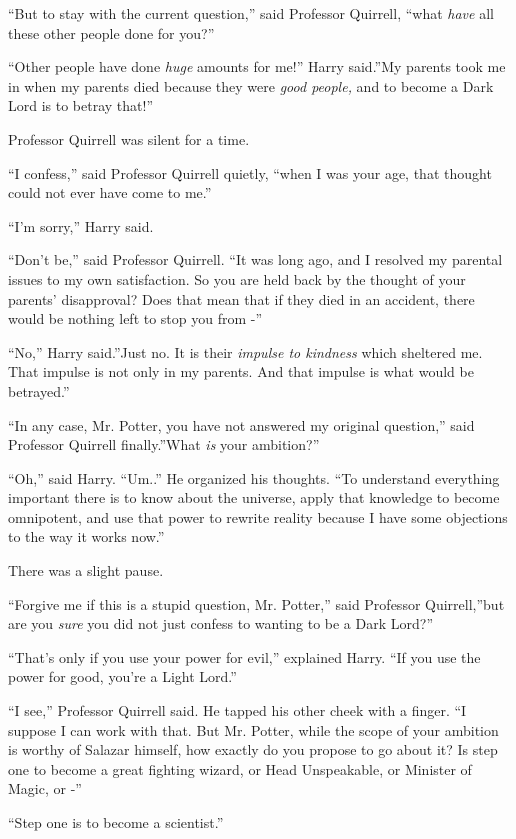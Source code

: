``But to stay with the current question,'' said Professor Quirrell,
``what \emph{have} all these other people done for you?''

``Other people have done \emph{huge} amounts for me!'' Harry said.''My
parents took me in when my parents died because they were \emph{good
people,} and to become a Dark Lord is to betray that!''

Professor Quirrell was silent for a time.

``I confess,'' said Professor Quirrell quietly, ``when I was your age,
that thought could not ever have come to me.''

``I'm sorry,'' Harry said.

``Don't be,'' said Professor Quirrell. ``It was long ago, and I resolved
my parental issues to my own satisfaction. So you are held back by the
thought of your parents' disapproval? Does that mean that if they died
in an accident, there would be nothing left to stop you from -''

``No,'' Harry said.''Just no. It is their \emph{impulse to kindness}
which sheltered me. That impulse is not only in my parents. And that
impulse is what would be betrayed.''

``In any case, Mr. Potter, you have not answered my original question,''
said Professor Quirrell finally.''What \emph{is} your ambition?''

``Oh,'' said Harry. ``Um..'' He organized his thoughts. ``To understand
everything important there is to know about the universe, apply that
knowledge to become omnipotent, and use that power to rewrite reality
because I have some objections to the way it works now.''

There was a slight pause.

``Forgive me if this is a stupid question, Mr. Potter,'' said Professor
Quirrell,''but are you \emph{sure} you did not just confess to wanting
to be a Dark Lord?''

``That's only if you use your power for evil,'' explained Harry. ``If
you use the power for good, you're a Light Lord.''

``I see,'' Professor Quirrell said. He tapped his other cheek with a
finger. ``I suppose I can work with that. But Mr. Potter, while the
scope of your ambition is worthy of Salazar himself, how exactly do you
propose to go about it? Is step one to become a great fighting wizard,
or Head Unspeakable, or Minister of Magic, or -''

``Step one is to become a scientist.''

